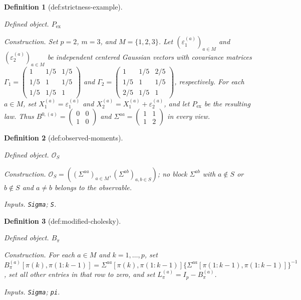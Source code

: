 \documentclass{article}
\newtheorem{definition}{Definition}
\begin{document}
\begin{definition}[def:strictness-example]\label{def:strictness-example}
\par\smallskip\noindent\emph{Defined object.} \(P_{\mathrm{ex}}\)
\par\smallskip\noindent\emph{Construction.} Set \(p=2\), \(m=3\), and \(M=\{1,2,3\}\). Let \((\varepsilon_1^{(a)})_{a\in M}\) and \((\varepsilon_2^{(a)})_{a\in M}\) be independent centered Gaussian vectors with covariance matrices \(\Gamma_1=\begin{pmatrix}1&1/5&1/5\\1/5&1&1/5\\1/5&1/5&1\end{pmatrix}\) and \(\Gamma_2=\begin{pmatrix}1&1/5&2/5\\1/5&1&1/5\\2/5&1/5&1\end{pmatrix}\), respectively. For each \(a\in M\), set \(X_1^{(a)}=\varepsilon_1^{(a)}\) and \(X_2^{(a)}=X_1^{(a)}+\varepsilon_2^{(a)}\), and let \(P_{\mathrm{ex}}\) be the resulting law. Thus \(B^{0,(a)}=\begin{pmatrix}0&0\\1&0\end{pmatrix}\) and \(\Sigma^{aa}=\begin{pmatrix}1&1\\1&2\end{pmatrix}\) in every view.
\end{definition}

\begin{definition}[def:observed-moments]\label{def:observed-moments}
\par\smallskip\noindent\emph{Defined object.} \(\mathcal O_S\)
\par\smallskip\noindent\emph{Construction.} \(\mathcal O_S=((\Sigma^{aa})_{a\in M},(\Sigma^{ab})_{a,b\in S})\); no block \(\Sigma^{ab}\) with \(a\notin S\) or \(b\notin S\) and \(a\ne b\) belongs to the observable.
\par\smallskip\noindent\emph{Inputs.} \texttt{Sigma}; \texttt{S}.
\end{definition}

\begin{definition}[def:modified-cholesky]\label{def:modified-cholesky}
\par\smallskip\noindent\emph{Defined object.} \(B_\pi\)
\par\smallskip\noindent\emph{Construction.} For each \(a\in M\) and \(k=1,\ldots,p\), set \(B_\pi^{(a)}[\pi(k),\pi(1{:}k-1)]=\Sigma^{aa}[\pi(k),\pi(1{:}k-1)]\{\Sigma^{aa}[\pi(1{:}k-1),\pi(1{:}k-1)]\}^{-1}\), set all other entries in that row to zero, and set \(L_\pi^{(a)}=I_p-B_\pi^{(a)}\).
\par\smallskip\noindent\emph{Inputs.} \texttt{Sigma}; \texttt{pi}.
\end{definition}
\end{document}
